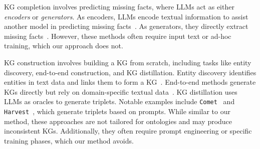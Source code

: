 \Gls{KG} completion involves predicting missing facts, where \glspl{LLM} act as either \emph{encoders} or \emph{generators}.
%
As encoders, \glspl{LLM} encode textual information to assist another model in predicting missing facts~\cite{llm-as-encoders-choi-2021,llm-as-encoders-wang-2021,llm-as-encoders-shen-2023}.
%
As generators, they directly extract missing facts~\cite{kg-complenion-saxena-2022,kg-complenion-chen-2022,kg-complenion-xin-2022,ZhuWCQOYDCZ24}.
%
However, these methods often require input text or ad-hoc training, which our approach does not.


\Gls{KG} construction involves building a \gls{KG} from scratch, including tasks like entity discovery, end-to-end construction, and KG distillation.
%
Entity discovery identifies entities in text data and links them to form a \gls{KG}~\cite{entity-discovery-ayoola-2022,entity-discovery-decao-2021}.
%
End-to-end methods generate \glspl{KG} directly but rely on domain-specific textual data~\cite{end-to-end-kg-kumar-2020,end-tp-end-kg-melnyk-2021,end-to-end-kg-han-2023}.
%
\Gls{KG} distillation uses \glspl{LLM} as oracles to generate triplets.
%
Notable examples include \texttt{Comet}~\cite{comet-2019} and \texttt{Harvest}~\cite{HaoTTNSZXH23}, which generate triplets based on prompts.
%
While similar to our method, these approaches are not tailored for ontologies and may produce inconsistent \glspl{KG}.
%
Additionally, they often require prompt engineering or specific training phases, which our method avoids.


